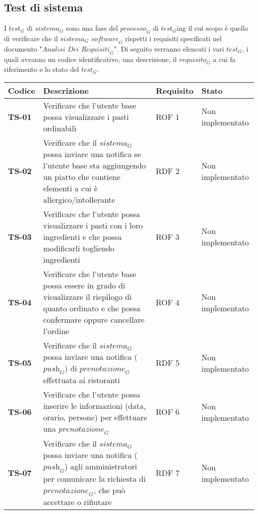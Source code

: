 \subsection{Test di sistema}
I $\textit{test}_G$ di $\textit{sistema}_G$ sono una fase del $\textit{processo}_G$ di $\textit{test}_G$ing il cui scopo è quello di verificare che il $\textit{sistema}_G$ $\textit{software}_G$ rispetti i requisiti specificati nel documento "$\textit{Analisi Dei Requisiti}_G$".
Di seguito verranno elencati i vari $\textit{test}_G$, i quali avranno un codice identificativo, una descrizione, il $\textit{requisito}_G$ a cui fa riferimento e lo stato del $\textit{test}_G$.
    \begin{longtable}{|>{\centering\arraybackslash}p{1.5cm}|p{9.8cm}|p{2cm}|p{3.5cm}|}
    \hline
    \rowcolor{gray!30}
    \textbf{Codice} & \textbf{Descrizione} & \textbf{Requisito} & \textbf{Stato} \\
    \hline
    \rowcolor{gray!10}
    \textbf{TS-01} & Verificare che l'utente base possa visualizzare i pasti ordinabili & ROF 1 & Non implementato \\
    \hline
    \rowcolor{gray!10}
    \textbf{TS-02} & Verificare che il $\textit{sistema}_G$ possa inviare una notifica se l'utente base sta aggiungendo un piatto che contiene elementi a cui è allergico/intollerante & RDF 2 & Non implementato \\ 
    \hline 
    \rowcolor{gray!10}
    \textbf{TS-03} & Verificare che l'utente possa visualizzare i pasti con i loro ingredienti e che possa modificarli togliendo ingredienti & ROF 3 & Non implementato \\ 
    \hline
    \rowcolor{gray!10}
    \textbf{TS-04} & Verificare che l'utente base possa essere in grado di visualizzare il riepilogo di quanto ordinato e che possa confermare oppure cancellare l'ordine & ROF 4 & Non implementato \\ 
    \hline
    \rowcolor{gray!10}
    \textbf{TS-05} & Verificare che il $\textit{sistema}_G$ possa inviare una notifica ($\textit{push}_G$) di $\textit{prenotazione}_G$ effettuata ai ristoranti & RDF 5 & Non implementato \\ 
    \hline
    \rowcolor{gray!10}
    \textbf{TS-06} & Verificare che l'utente possa inserire le informazioni (data, orario, persone) per effettuare una $\textit{prenotazione}_G$ & ROF 6 & Non implementato \\
    \hline
    \rowcolor{gray!10}
    \textbf{TS-07} & Verificare che il $\textit{sistema}_G$ possa inviare una notifica ($\textit{push}_G$) agli amministratori per comunicare la richiesta di $\textit{prenotazione}_G$, che può accettare o rifiutare & RDF 7 & Non implementato \\

\end{longtable}
